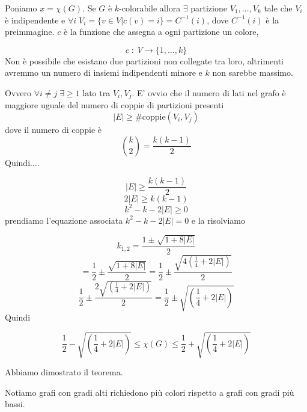 \documentclass[12pt]{report}
\begin{document}
\begin{dimo}
    Poniamo $x = \chi(G)$.
    Se $G$ è $k$-colorabile allora $\exists$ partizione $V_1,\dots,V_k$ tale che $V_i$ è indipendente e $\forall i \; V_i= \{v \in V | c(v) = i\} = C^{-1}(i)$, dove $C^{-1}(i)$ è la preimmagine. $c$ è la funzione che assegna a ogni partizione un colore,

    $$c\;:\; V \rightarrow \{1,\dots,k\}$$
    Non è possibile che esistano due partizioni non collegate tra loro, altrimenti avremmo un numero di insiemi indipendenti minore e $k$ non sarebbe massimo.


    \noindent 
    Ovvero $\forall i \neq j \; \exists \geq 1$ lato tra $V_i,V_j$. E' ovvio che il numero di lati nel grafo è maggiore uguale del numero di coppie di partizioni presenti
    $$|E| \geq \text{\#coppie}(V_i,V_j)$$
    dove il numero di coppie è $$\binom{k}{2} = \frac{k(k-1)}{2}$$
    Quindi....

    $$|E| \geq \frac{k(k-1)}{2}$$
    $$2|E| \geq k(k-1)$$
    $$k^2 -k -2|E| \geq 0$$
    prendiamo l'equazione associata $k^2 -k -2|E| = 0$ e la risolviamo

    $$k_{1,2} = \frac{1 \pm \sqrt{1 + 8|E|}}{2}$$
    $$= \frac{1}{2} \pm \frac{\sqrt{1 + 8|E|}}{2} = \frac{1}{2} \pm \frac{\sqrt{4(\frac{1}{4} + 2|E|)}}{2} $$
    $$\frac{1}{2} \pm \frac{2\sqrt{(\frac{1}{4} + 2|E|)}}{2} =  \frac{1}{2} \pm \sqrt{(\frac{1}{4} + 2|E|)}$$
    Quindi 

    $$
            \frac{1}{2} - \sqrt{(\frac{1}{4} + 2|E|)} \leq \chi(G)  \leq \frac{1}{2} + \sqrt{(\frac{1}{4} + 2|E|)}$$
   
    Abbiamo dimostrato il teorema.
\end{dimo}

\noindent 
Notiamo grafi con gradi alti richiedono più colori rispetto a grafi con gradi più bassi. 
\end{document}
